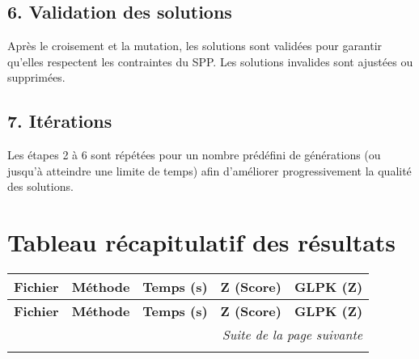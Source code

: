 \begin{minipage}
\subsection*{6. Validation des solutions}

Après le croisement et la mutation, les solutions sont validées pour garantir qu'elles respectent les contraintes du SPP. Les solutions invalides sont ajustées ou supprimées.

\subsection*{7. Itérations}

Les étapes 2 à 6 sont répétées pour un nombre prédéfini de générations (ou jusqu'à atteindre une limite de temps) afin d'améliorer progressivement la qualité des solutions.

\section{Tableau récapitulatif des résultats}

\begin{longtable}{|l|l|c|c|c|}
\hline
\textbf{Fichier} & \textbf{Méthode} & \textbf{Temps (s)} & \textbf{Z (Score)} & \textbf{GLPK (Z)} \\
\hline
\endfirsthead

\hline
\textbf{Fichier} & \textbf{Méthode} & \textbf{Temps (s)} & \textbf{Z (Score)} & \textbf{GLPK (Z)} \\
\hline
\endhead

\hline
\multicolumn{5}{|r|}{\textit{Suite de la page suivante}} \\
\hline
\endfoot

\hline
\endlastfoot


\end{longtable}
\end{minipage}
